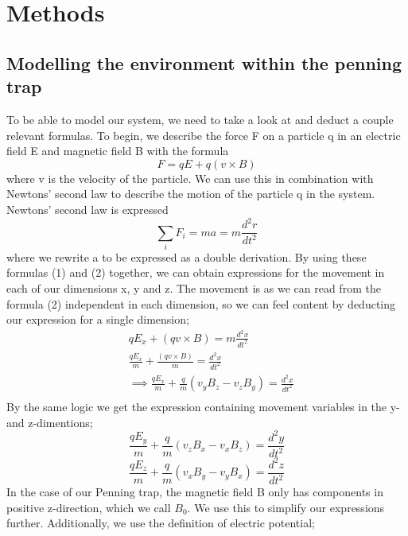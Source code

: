 \documentclass[english,notitlepage,reprint,nofootinbib,twocolumn]{article}
\begin{document}
\section{Methods}\label{sec:methods}
\subsection{Modelling the environment within the penning trap}
To be able to model our system, we need to take a look at and deduct a couple relevant 
formulas. To begin, we describe the force F on a particle q in an electric field E and
magnetic field B with the formula
\begin{equation}
    F = qE + q(v \times B)
\end{equation}
where v is the velocity of the particle. We can use this in combination with Newtons' second law 
to describe the motion of the particle q in the system. Newtons' second law is expressed 
\begin{equation}
    \sum_{i}{F_i} = ma = m \frac{d^2r}{dt^2}
\end{equation}
where we rewrite a to be expressed as a double derivation. By using these formulas (1) and (2) together, we can obtain expressions for the movement in each of our dimensions x, y and z. The movement is as we can read from the formula (2) independent in each dimension, so we can feel content by deducting our expression for a single dimension; 
\begin{equation}
    \begin{split}
        & qE_x + \left(qv \times B \right)= m \frac{d^2x}{dt^2}  \\
        & \frac{qE_x}{m}+\frac{\left(qv \times B \right)}{m} = \frac{d^2x}{dt^2}    \\
        & \implies  \frac{qE_x}{m}+\frac{q}{m}\left(v_yB_z-v_zB_y \right) = \frac{d^2x}{dt^2} \\
    \end{split}
\end{equation}
By the same logic we get the expression containing movement variables in the y- and z-dimentions;
\begin{equation}
    \frac{qE_y}{m}+\frac{q}{m}\left(v_zB_x-v_xB_z \right) = \frac{d^2y}{dt^2}
\end{equation}
\begin{equation}
    \frac{qE_z}{m}+\frac{q}{m}\left(v_xB_y-v_yB_x \right) = \frac{d^2z}{dt^2}
\end{equation}
In the case of our Penning trap, the magnetic field B only has components in positive z-direction, which we call $B_0$. We use this to simplify our expressions further. Additionally, we use the definition of electric potential; 
\end{document}
